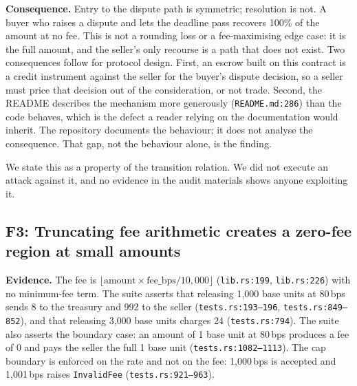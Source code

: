 \documentclass[sigconf,review]{acmart}
\begin{document}
\textbf{Consequence.} Entry to the dispute path is symmetric; resolution is
not. A buyer who raises a dispute and lets the deadline pass recovers 100\% of
the amount at no fee. This is not a rounding loss or a fee-maximising
edge case: it is the full amount, and the seller's only recourse is a path
that does not exist. Two consequences follow for protocol design. First, an
escrow built on this contract is a credit instrument against the seller for
the buyer's dispute decision, so a seller must price that decision out of the
consideration, or not trade. Second, the README describes the mechanism more
generously (\texttt{README.md:286}) than the code behaves, which is the
defect a reader relying on the documentation would inherit. The repository
documents the behaviour; it does not analyse the consequence. That gap, not
the behaviour alone, is the finding.

We state this as a property of the transition relation. We did not execute an
attack against it, and no evidence in the audit materials shows anyone
exploiting it.


\subsection{F3: Truncating fee arithmetic creates a zero-fee region at small
amounts}
\label{f:fee}

\textbf{Evidence.} The fee is
$\lfloor \mathrm{amount} \times \mathrm{fee\_bps} / 10{,}000 \rfloor$
(\texttt{lib.rs:199}, \texttt{lib.rs:226}) with no minimum-fee term. The suite
asserts that releasing 1{,}000 base units at 80\,bps sends 8 to the treasury
and 992 to the seller (\texttt{tests.rs:193--196}, \texttt{tests.rs:849--852}),
and that releasing 3{,}000 base units charges 24 (\texttt{tests.rs:794}). The
suite also asserts the boundary case: an amount of 1 base unit at 80\,bps
produces a fee of 0 and pays the seller the full 1 base unit
(\texttt{tests.rs:1082--1113}). The cap boundary is enforced on the rate and
not on the fee: 1{,}000\,bps is accepted and 1{,}001\,bps raises
\texttt{InvalidFee} (\texttt{tests.rs:921--963}).
\end{document}
